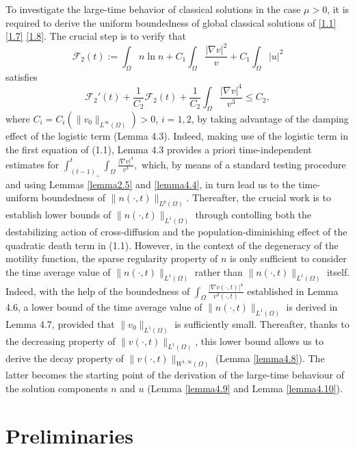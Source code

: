 \documentclass[12pt]{article}
\theoremstyle{plain}
\theoremstyle{definition}
\numberwithin{equation}{section}
\begin{document}
To investigate the large-time behavior of classical solutions in the case $\mu>0$,  it is required  to  derive  the uniform boundedness of global classical solutions of  \eqref{1.1} \eqref{1.7} \eqref{1.8}. The  crucial step is  to verify that
 $$
\mathcal{F}_2(t):=   \int_\Omega n\ln n+ C_1 \int_\Omega
\frac{|\nabla v|^2}v
+C_1 \int_\Omega |u|^2
$$
satisfies
  $$
\mathcal{F}_2'(t)+\frac{1}{C_2} \mathcal{F}_2(t)+ \frac{1}{C_2}
 \int_\Omega \frac{|\nabla v|^4}{v^3}\leq C_2,
$$
where $C_i=C_i(\|v_{0}\|_{L^{\infty}(\Omega)})>0$,  $i=1,2$, by taking advantage of the damping effect of the logistic term (Lemma 4.3). Indeed,
making use of the logistic term in the first equation of (1.1),
Lemma 4.3 provides a priori time-independent estimates for
$
 \int^{t}_{(t-1)_+} \int_\Omega  \frac{|\nabla v|^4}{v^3},
$
which, by means of a standard testing procedure and using Lemmas \ref{lemma2.5} and \ref{lemma4.4}, in turn lead us to the time-uniform boundedness
of  $\|n(\cdot,t)\|_{L^p(\Omega)}$. Thereafter, the crucial work is to establish lower bounds of  $\|n(\cdot,t)\|_{L^1(\Omega)}$
through contolling both the destabilizing action of cross-diffusion and the population-diminishing effect of the quadratic death term in (1.1).
However, in the context of the degeneracy of the motility function, the sparse regularity property of $n$ is only sufficient to consider the time average value of
$\|n(\cdot,t)\|_{L^1(\Omega)}$ rather than $\|n(\cdot,t)\|_{L^1(\Omega)}$ itself. Indeed, with the help of the boundedness of $\int_\Omega \frac{|\nabla v(\cdot,t)|^4}{v^3(\cdot,t)}$
established in Lemma 4.6,  a lower bound of the time average value of $\|n(\cdot,t)\|_{L^1(\Omega)}$ is derived in Lemma 4.7, provided that $\|v_0\|_{L^1(\Omega)}$ is sufficiently small. Thereafter, thanks to the decreasing property of $\|v(\cdot,t)\|_{L^1(\Omega)}$, this lower bound allows us to derive the decay property of $\|v(\cdot,t)\|_{W^{1,\infty}(\Omega)}$ (Lemma \ref{lemma4.8}). The latter becomes the starting point of the derivation of the large-time behaviour of the solution components $n$ and $u$ (Lemma \ref{lemma4.9} and Lemma \ref{lemma4.10}).

\section{Preliminaries}
\end{document}
